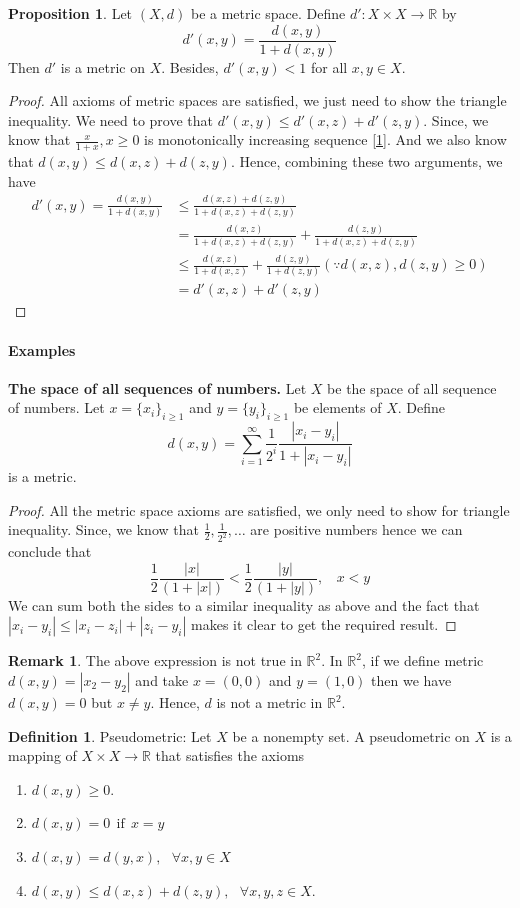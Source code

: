 \documentclass[12pt]{report}
\theoremstyle{definition}
\newtheorem{defn}{Definition}
\newtheorem*{rem}{Remark}
\newtheorem{prop}{Proposition}
\begin{document}
\begin{prop}
    Let $(X,d)$ be a metric space. Define $d':X \times X \to \mathbb{R}$ by 
    $$ d'(x,y) = \frac{d(x,y)}{1 + d(x,y)}$$
    Then $d'$ is a metric on $X$. Besides, $d'(x,y) < 1$ for all $x,y \in X$.
\end{prop}
\begin{proof}
    All axioms of metric spaces are satisfied, we just need to show the triangle inequality. We need to prove that $d'(x,y) \leq d'(x,z) + d'(z,y)$. Since, we know that $\frac{x}{1+x}, x\geq 0$ is monotonically increasing sequence \ref{1}. And we also know that $d(x,y) \leq d(x,z) + d(z,y)$. Hence, combining these two arguments, we have
    \begin{align*}
        d'(x,y) =  \frac{d(x,y)}{1 + d(x,y)} &\leq \frac{d(x,z) + d(z,y)}{1 + d(x,z) + d(z,y)}\\
        &= \frac{d(x,z)}{1 +  d(x,z) + d(z,y)} + \frac{d(z,y)}{1 +  d(x,z) + d(z,y)}\\
        &\leq \frac{d(x,z)}{1 +  d(x,z)} + \frac{d(z,y)}{1 +  d(z,y)}(\because d(x,z),d(z,y) \geq 0)\\
        &= d'(x,z) + d'(z,y)
    \end{align*}
\end{proof}
\paragraph*{Examples}
\textbf{The space of all sequences of numbers. } Let $X$ be the space of all sequence of numbers. Let $x = \{x_i\}_{i \geq 1}$ and $y = \{y_i\}_{i \geq 1}$ be elements of $X$. Define
$$ d(x,y) = \sum\limits_{i=1}^{\infty}\frac{1}{2^i}\frac{|x_i - y_i|}{1 + |x_i - y_i|}$$
is a metric.
\begin{proof}
    All the metric space axioms are satisfied, we only need to show for triangle inequality. Since, we know that $\frac{1}{2}, \frac{1}{2^2}, \dots$ are positive numbers hence we can conclude that
    $$ \frac{1}{2}\frac{|x|}{(1 + |x|)} < \frac{1}{2}\frac{|y|}{(1 + |y|)},~~~~x < y$$
    We can sum both the sides to a similar inequality as above and the fact that $|x_i - y_i| \leq |x_i - z_i| + |z_i - y_i|$ makes it clear to get the required result.    
\end{proof}
\begin{rem}
    The above expression is not true in $\mathbb{R}^2$. In $\mathbb{R}^2$, if we define metric $d(x,y) = |x_2 - y_2|$ and  take $x = (0,0)$ and $y = (1,0)$ then we have $d(x,y) = 0$ but $x \neq y$. Hence, $d$ is not a metric in $\mathbb{R}^2$.
\end{rem}
\begin{defn}
    Pseudometric: Let $X$ be a nonempty set. A pseudometric on $X$ is a mapping of $X \times X \to \mathbb{R}$ that satisfies the axioms
    \begin{enumerate}
        \item $d(x,y) \geq 0$.
        \item $d(x,y) = 0~~\text{if}~~ x = y$
        \item $ d(x,y) = d(y,x),~~~\forall x,y \in X$
        \item $d(x,y) \leq d(x,z) + d(z,y),~~~\forall x,y,z \in X$.
    \end{enumerate}
\end{defn}
\end{document}
